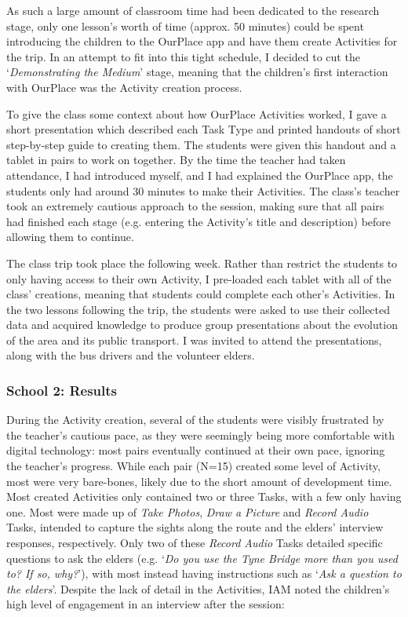 As such a large amount of classroom time had been dedicated to the research stage, only one lesson's worth of time (approx. 50 minutes) could be spent introducing the children to the OurPlace app and have them create Activities for the trip. In an attempt to fit into this tight schedule, I decided to cut the `\textit{Demonstrating the Medium}' stage, meaning that the children's first interaction with OurPlace was the Activity creation process.

To give the class some context about how OurPlace Activities worked, I gave a short presentation which described each Task Type and printed handouts of short step-by-step guide to creating them. The students were given this handout and a tablet in pairs to work on together. By the time the teacher had taken attendance, I had introduced myself, and I had explained the OurPlace app, the students only had around 30 minutes to make their Activities. The class's teacher took an extremely cautious approach to the session, making sure that all pairs had finished each stage (e.g. entering the Activity's title and description) before allowing them to continue.

The class trip took place the following week. Rather than restrict the students to only having access to their own Activity, I pre-loaded each tablet with all of the class' creations, meaning that students could complete each other's Activities. In the two lessons following the trip, the students were asked to use their collected data and acquired knowledge to produce group presentations about the evolution of the area and its public transport. I was invited to attend the presentations, along with the bus drivers and the volunteer elders.

\subsubsection{School 2: Results}

During the Activity creation, several of the students were visibly frustrated by the teacher's cautious pace, as they were seemingly being more comfortable with digital technology: most pairs eventually continued at their own pace, ignoring the teacher's progress. While each pair (N=15) created some level of Activity, most were very bare-bones, likely due to the short amount of development time. Most created Activities only contained two or three Tasks, with a few only having one. Most were made up of \textit{Take Photos}, \textit{Draw a Picture} and \textit{Record Audio} Tasks, intended to capture the sights along the route and the elders' interview responses, respectively. Only two of these \textit{Record Audio} Tasks detailed specific questions to ask the elders (e.g. `\textit{Do you use the Tyne Bridge more than you used to? If so, why?}'), with most instead having instructions such as `\textit{Ask a question to the elders}'. Despite the lack of detail in the Activities, IAM noted the children's high level of engagement in an interview after the session:

